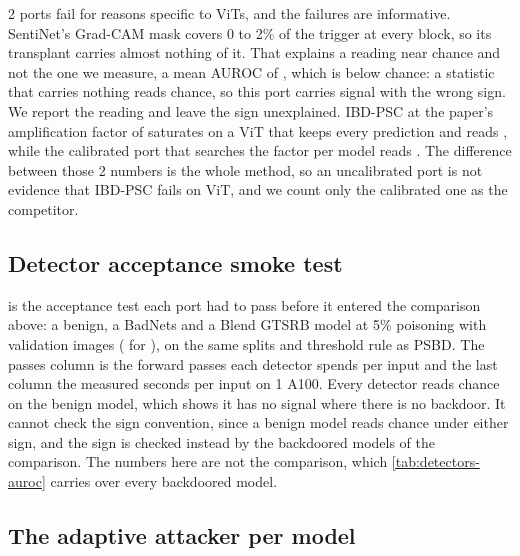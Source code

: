 2 ports fail for reasons specific to ViTs, and the failures are informative. SentiNet's Grad-CAM \cite{selvaraju2017gradcam} mask covers 0 to 2\% of the trigger at every block, so its transplant carries almost nothing of it. That explains a reading near chance and not the one we measure, a mean AUROC of \DetectorsAurocSentinet{}, which is below chance: a statistic that carries nothing reads chance, so this port carries signal with the wrong sign. We report the reading and leave the sign unexplained. IBD-PSC at the paper's amplification factor of \DetectorsIbdPscFactor{} saturates on a ViT that keeps every prediction and reads \DetectorsAurocIbdPsc{}, while the calibrated port that searches the factor per model reads \DetectorsAurocBestCompetitor{}. The difference between those 2 numbers is the whole method, so an uncalibrated port is not evidence that IBD-PSC fails on ViT, and we count only the calibrated one as the competitor.


\FloatBarrier

\FloatBarrier

\FloatBarrier


\subsection{Detector acceptance smoke test}
\label{app:smoke}

 is the acceptance test each port had to pass before it entered the comparison above: a benign, a BadNets and a Blend GTSRB model at 5\% poisoning with \SmokeValidationImages{} validation images (\SmokeValidationImagesExceptionSize{} for \SmokeValidationImagesExceptions{}), on the same splits and threshold rule as PSBD. The passes column is the forward passes each detector spends per input and the last column the measured seconds per input on 1 A100. Every detector reads chance on the benign model, which shows it has no signal where there is no backdoor. It cannot check the sign convention, since a benign model reads chance under either sign, and the sign is checked instead by the backdoored models of the comparison. The numbers here are not the comparison, which \cref{tab:detectors-auroc} carries over every backdoored model.


\FloatBarrier


\subsection{The adaptive attacker per model}
\label{app:adaptive}

